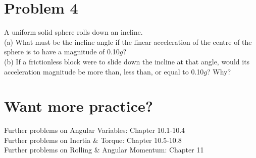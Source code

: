 \documentclass[11pt]{article}
\begin{document}
\section*{Problem 4}

A uniform solid sphere rolls down an incline. \\
(a) What must be the incline angle if the linear acceleration of the centre of the sphere is to have a magnitude of 0.10$g$? \\
(b) If a frictionless block were to slide down the incline at that angle, would its acceleration magnitude be more than, less than, or equal to 0.10$g$? Why?\\


\section*{Want more practice?}
\small
Further problems on Angular Variables: Chapter 10.1-10.4 \\
Further problems on Inertia \& Torque: Chapter 10.5-10.8 \\
Further problems on Rolling \& Angular Momentum: Chapter 11\\
\end{document}

